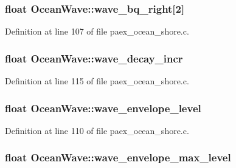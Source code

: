\subsubsection[{\texorpdfstring{wave\+\_\+bq\+\_\+right}{wave_bq_right}}]{\setlength{\rightskip}{0pt plus 5cm}float Ocean\+Wave\+::wave\+\_\+bq\+\_\+right\mbox{[}2\mbox{]}}\hypertarget{struct_ocean_wave_a9b11563586b3d01e068a92d27715d6de}{}\label{struct_ocean_wave_a9b11563586b3d01e068a92d27715d6de}


Definition at line 107 of file paex\+\_\+ocean\+\_\+shore.\+c.

\subsubsection[{\texorpdfstring{wave\+\_\+decay\+\_\+incr}{wave_decay_incr}}]{\setlength{\rightskip}{0pt plus 5cm}float Ocean\+Wave\+::wave\+\_\+decay\+\_\+incr}\hypertarget{struct_ocean_wave_ada6ae9c11ee04ba30ca61fc22ba0362f}{}\label{struct_ocean_wave_ada6ae9c11ee04ba30ca61fc22ba0362f}


Definition at line 115 of file paex\+\_\+ocean\+\_\+shore.\+c.

\subsubsection[{\texorpdfstring{wave\+\_\+envelope\+\_\+level}{wave_envelope_level}}]{\setlength{\rightskip}{0pt plus 5cm}float Ocean\+Wave\+::wave\+\_\+envelope\+\_\+level}\hypertarget{struct_ocean_wave_a53bf7a8e1f27f3bc9c1a099a1faf1334}{}\label{struct_ocean_wave_a53bf7a8e1f27f3bc9c1a099a1faf1334}


Definition at line 110 of file paex\+\_\+ocean\+\_\+shore.\+c.

\subsubsection[{\texorpdfstring{wave\+\_\+envelope\+\_\+max\+\_\+level}{wave_envelope_max_level}}]{\setlength{\rightskip}{0pt plus 5cm}float Ocean\+Wave\+::wave\+\_\+envelope\+\_\+max\+\_\+level}\hypertarget{struct_ocean_wave_a461d0f27c5564cabc2ae5e4f756c3dbb}{}\label{struct_ocean_wave_a461d0f27c5564cabc2ae5e4f756c3dbb}


